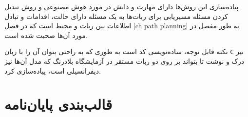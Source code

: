 پیاده‌سازی این روش‌ها دارای مهارت و دانش در مورد هوش مصنوعی و روش تبدیل کردن مسئله مسیریابی برای ربات‌ها به یک مسئله دارای حالت، اقدامات و تبادل اطلاعات بین ربات‌ و محیط است که در فصل \ref{ch path planning} به طور مفصل در مورد آن‌ها صحبت شده است.

نکته قابل توجه، ساده‌نویسی کد است به طوری که به راحتی بتوان آن را با زبان \verb|C| نیز درک و نوشت تا بتواند بر روی دو ربات مستقر در آزمایشگاه بلادرنگ که مدل آن‌ها نیز دیفرانسیلی است، پیاده‌سازی کرد.

\section{قالب‌بندی پایان‌نامه}






















